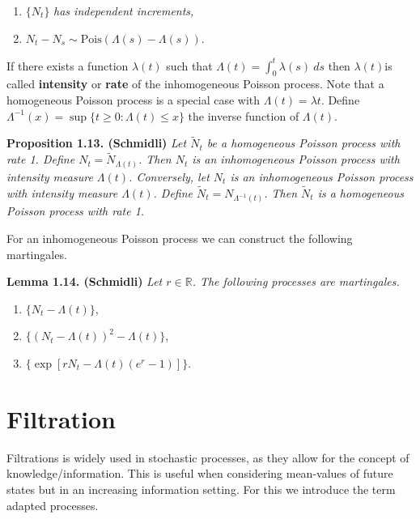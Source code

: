 \documentclass[a4paper,10pt,openany]{book}
\providecommand{\tightlist}{%
 \setlength{\itemsep}{0pt}\setlength{\parskip}{0pt}}
\begin{document}
\begin{enumerate}
\def\labelenumi{\roman{enumi})}
\tightlist
\item
  \(\{N_t\}\) \emph{has independent increments,}
\item
  \(N_t-N_s\sim\text{Pois}(\Lambda (s)-\Lambda(s))\).
\end{enumerate}

If there exists a function \(\lambda(t)\) such that \(\Lambda(t) = \int_0^t \lambda(s)\ ds\) then \(\lambda(t)\)is called \textbf{intensity} or \textbf{rate} of the inhomogeneous Poisson process. Note that a homogeneous Poisson process is a special case with \(\Lambda(t) = \lambda t\). Define \(\Lambda^{−1}(x) = \sup\{t \ge 0 : \Lambda(t) \le x\}\) the inverse function of \(\Lambda(t)\).

\textbf{Proposition 1.13. (Schmidli)} \emph{Let \(\tilde N_t\) be a homogeneous Poisson process with rate 1. Define \(N_t=\tilde N_{\Lambda (t)}\). Then \(N_t\) is an inhomogeneous Poisson process with intensity measure \(\Lambda(t)\). Conversely, let \(N_t\) is an inhomogeneous Poisson process with intensity measure \(\Lambda(t)\). Define \(\tilde N_t=N_{\Lambda^{-1}(t)}\). Then \(\tilde N_t\) is a homogeneous Poisson process with rate 1.}

For an inhomogeneous Poisson process we can construct the following martingales.

\textbf{Lemma 1.14. (Schmidli)} \emph{Let \(r\in \mathbb R\). The following processes are martingales.}

\begin{enumerate}
\def\labelenumi{\roman{enumi})}
\tightlist
\item
  \(\{N_t-\Lambda(t)\}\),
\item
  \(\{(N_t-\Lambda(t))^2-\Lambda(t)\}\),
\item
  \(\{\exp[rN_t-\Lambda(t)(e^r-1)]\}\).
\end{enumerate}

\hypertarget{filtration}{%
\section{Filtration}\label{filtration}}

Filtrations is widely used in stochastic processes, as they allow for the concept of knowledge/information. This is useful when considering mean-values of future states but in an increasing information setting. For this we introduce the term adapted processes.
\end{document}
